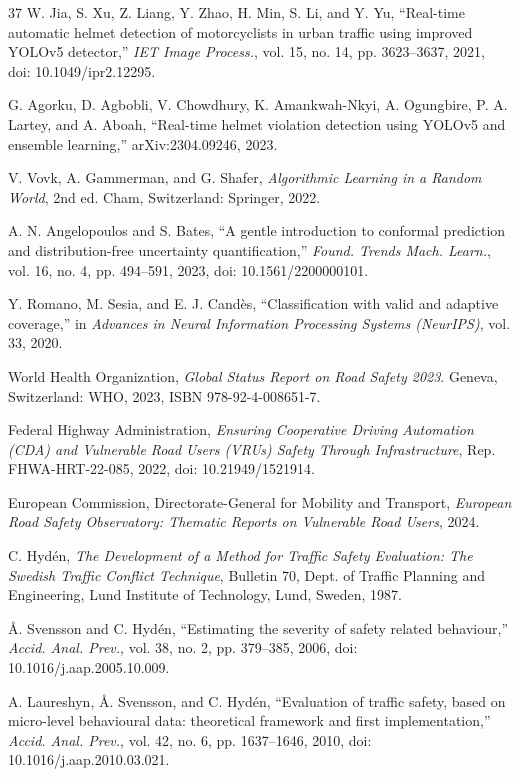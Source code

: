 \documentclass[journal]{IEEEtran}
\begin{document}
\begin{thebibliography}{37}
 W. Jia, S. Xu, Z. Liang, Y. Zhao, H. Min, S. Li, and Y. Yu, ``Real-time automatic helmet detection of motorcyclists in urban traffic using improved YOLOv5 detector,'' \emph{IET Image Process.}, vol. 15, no. 14, pp. 3623--3637, 2021, doi: 10.1049/ipr2.12295.

 G. Agorku, D. Agbobli, V. Chowdhury, K. Amankwah-Nkyi, A. Ogungbire, P. A. Lartey, and A. Aboah, ``Real-time helmet violation detection using YOLOv5 and ensemble learning,'' arXiv:2304.09246, 2023.

 V. Vovk, A. Gammerman, and G. Shafer, \emph{Algorithmic Learning in a Random World}, 2nd ed. Cham, Switzerland: Springer, 2022.

 A. N. Angelopoulos and S. Bates, ``A gentle introduction to conformal prediction and distribution-free uncertainty quantification,'' \emph{Found. Trends Mach. Learn.}, vol. 16, no. 4, pp. 494--591, 2023, doi: 10.1561/2200000101.

 Y. Romano, M. Sesia, and E. J. Cand\`es, ``Classification with valid and adaptive coverage,'' in \emph{Advances in Neural Information Processing Systems (NeurIPS)}, vol. 33, 2020.

 World Health Organization, \emph{Global Status Report on Road Safety 2023}. Geneva, Switzerland: WHO, 2023, ISBN 978-92-4-008651-7.

 Federal Highway Administration, \emph{Ensuring Cooperative Driving Automation (CDA) and Vulnerable Road Users (VRUs) Safety Through Infrastructure}, Rep. FHWA-HRT-22-085, 2022, doi: 10.21949/1521914.

 European Commission, Directorate-General for Mobility and Transport, \emph{European Road Safety Observatory: Thematic Reports on Vulnerable Road Users}, 2024.

 C. Hyd\'en, \emph{The Development of a Method for Traffic Safety Evaluation: The Swedish Traffic Conflict Technique}, Bulletin 70, Dept. of Traffic Planning and Engineering, Lund Institute of Technology, Lund, Sweden, 1987.

 \AA. Svensson and C. Hyd\'en, ``Estimating the severity of safety related behaviour,'' \emph{Accid. Anal. Prev.}, vol. 38, no. 2, pp. 379--385, 2006, doi: 10.1016/j.aap.2005.10.009.

 A. Laureshyn, \AA. Svensson, and C. Hyd\'en, ``Evaluation of traffic safety, based on micro-level behavioural data: theoretical framework and first implementation,'' \emph{Accid. Anal. Prev.}, vol. 42, no. 6, pp. 1637--1646, 2010, doi: 10.1016/j.aap.2010.03.021.


\end{thebibliography}
\end{document}
